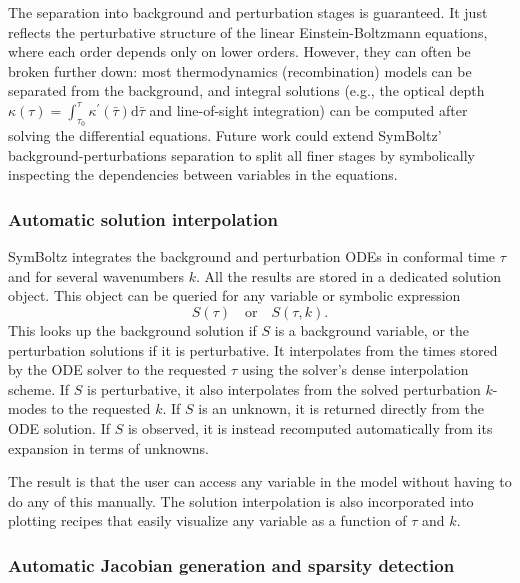 \documentclass{aa}
\begin{document}
The separation into background and perturbation stages is guaranteed.
It just reflects the perturbative structure of the linear Einstein-Boltzmann equations, where each order depends only on lower orders.
However, they can often be broken further down: most thermodynamics (recombination) models can be separated from the background, and integral solutions (e.g., the optical depth $\kappa(\tau) = \int_{\tau_0}^\tau \kappa^\prime(\bar\tau) \mathrm{d}\bar\tau$ and line-of-sight integration) can be computed after solving the differential equations.
Future work could extend SymBoltz' background-perturbations separation to split all finer stages by symbolically inspecting the dependencies between variables in the equations.

\subsubsection{Automatic solution interpolation}
\label{sec:interpolation}

SymBoltz integrates the background and perturbation ODEs in conformal time $\tau$ and for several wavenumbers $k$.
All the results are stored in a dedicated solution object.
This object can be queried for any variable or symbolic expression
\begin{equation}
    S(\tau) \quad \text{or} \quad S(\tau, k).
\end{equation}
This looks up the background solution if $S$ is a background variable, or the perturbation solutions if it is perturbative.
It interpolates from the times stored by the ODE solver to the requested $\tau$ using the solver's dense interpolation scheme.
If $S$ is perturbative, it also interpolates from the solved perturbation $k$-modes to the requested $k$.
If $S$ is an unknown, it is returned directly from the ODE solution.
If $S$ is observed, it is instead recomputed automatically from its expansion in terms of unknowns.

The result is that the user can access any variable in the model without having to do any of this manually.
The solution interpolation is also incorporated into plotting recipes that easily visualize any variable as a function of $\tau$ and $k$.

\subsubsection{Automatic Jacobian generation and sparsity detection}
\label{sec:jacobian}
\end{document}
